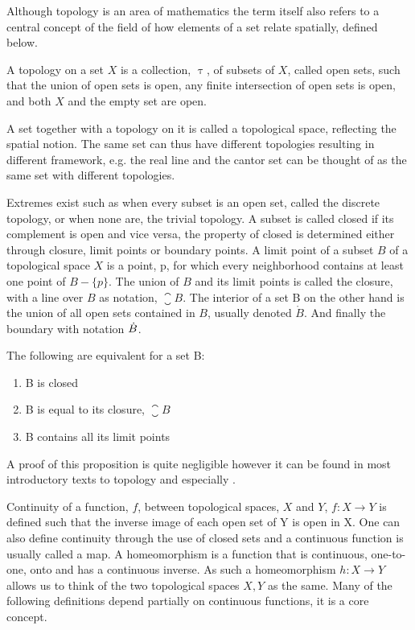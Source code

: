\documentclass[../../main.tex]{subfiles}
\begin{document}
    Although topology is an area of mathematics the term itself also refers to a central concept of the field of how elements of a set relate spatially, defined below. 

    \begin{definition}
        A topology on a set $X$ is a collection, $\uptau$, of subsets of $X$, called open sets, such that the union of open sets is open, any finite intersection of open sets is open, and both $X$ and the empty set are open. 
    \end{definition}

    A set together with a topology on it is called a topological space, reflecting the spatial notion. The same set can thus have different topologies resulting in different framework, e.g. the real line and the cantor set can be thought of as the same set with different topologies. 
            
    Extremes exist such as when every subset is an open set, called the discrete topology, or when none are, the trivial topology. A subset is called closed if its complement is open and vice versa, the property of closed is determined either through closure, limit points or boundary points. A limit point of a subset $B$ of a topological space $X$ is a point, p, for which every neighborhood contains at least one point of $B - \{p\}$. The union of $B$ and its limit points is called the closure, with a line over $B$ as notation, $\closure{B}$. The interior of a set B on the other hand is the union of all open sets contained in $B$, usually denoted $\mathring{B}$. And finally the boundary with notation $\dot{B}$.
    
    \begin{proposition}
        The following are equivalent for a set B:
        \begin{enumerate}
            \item B is closed
            \item B is equal to its closure, $\closure{B}$
            \item B contains all its limit points
        \end{enumerate}
    \end{proposition}

    A proof of this proposition is quite negligible however it can be found in most introductory texts to topology and especially \cite{armstrong-basictop}.
    
    Continuity of a function, $f$, between topological spaces, $X$ and $Y$, $f:X\to Y$ is defined such that the inverse image of each open set of Y is open in X. One can also define continuity through the use of closed sets and a continuous function is usually called a map. A homeomorphism is a function that is continuous, one-to-one, onto and has a continuous inverse. As such a homeomorphism $h:X\to Y$ allows us to think of the two topological spaces $X, Y$ as the same. Many of the following definitions depend partially on continuous functions, it is a core concept.
    
\end{document}
